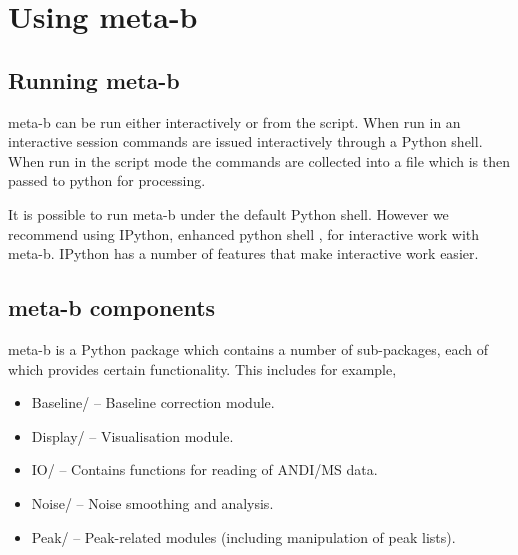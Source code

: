 

\chapter{Using meta-b}

\section{Running meta-b}

meta-b can be run either interactively or from the script. When run
in an interactive session commands are issued interactively through
a Python shell. When run in the script mode the commands are collected
into a file which is then passed to python for processing.

It is possible to run meta-b under the default Python shell. However
we recommend using IPython, enhanced python shell \cite{ipython},
for interactive work with meta-b. IPython has a number of features
that make interactive work easier.

\section{meta-b components}

meta-b is a Python package which contains a number of sub-packages,
each of which provides certain functionality. This includes for
example, 

\begin{itemize}
\item Baseline/ -- Baseline correction module.
\item Display/ -- Visualisation module.
\item IO/ -- Contains functions for reading of ANDI/MS data.
\item Noise/ -- Noise smoothing and analysis.
\item Peak/ -- Peak-related modules (including manipulation of peak
lists).
\end{itemize}

